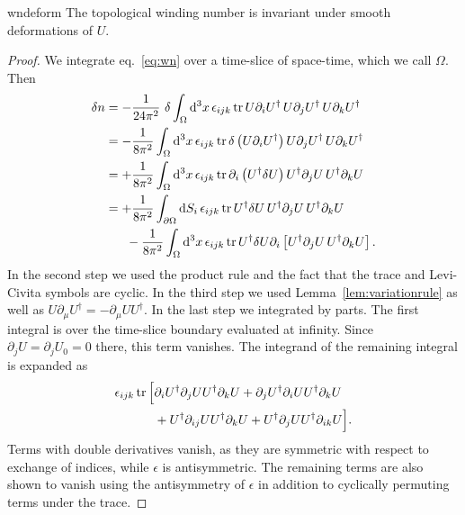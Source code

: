 \begin{theorem}{}{wndeform}
The topological winding number is invariant under smooth
deformations of $U$.
\begin{proof} We integrate eq.~\eqref{eq:wn} over a time-slice of space-time,
which we call $\Omega$. Then
  \begin{align*}
   \var n &=-\frac{1}{24\pi^2}~\var\int_\Omega\dd[3]{x}\epsilon_{ijk}\tr
                U\partial_iU^\dagger\,
                U\partial_jU^\dagger\,
                U\partial_kU^\dagger\\
            &=-\frac{1}{8\pi^2}\int_\Omega \dd[3]{x}\epsilon_{ijk}\tr
                \var\left(U\partial_iU^\dagger\right)
                            U\partial_jU^\dagger\,
                            U\partial_kU^\dagger\\
            &=+\frac{1}{8\pi^2}\int_\Omega \dd[3]{x}\epsilon_{ijk}\tr
                \partial_i\left(U^\dagger\var U\right)
                 U^\dagger\partial_jU\,
                 U^\dagger\partial_kU\\
            &=+\frac{1}{8\pi^2}\int_{\partial\Omega} \dd{S_i}\epsilon_{ijk}\tr
                U^\dagger\var U\,
                U^\dagger\partial_j U\,
                U^\dagger\partial_k U\\
            &~~~~~-\frac{1}{8\pi^2}\int_\Omega \dd[3]{x}\epsilon_{ijk}\tr
                U^\dagger\var U\partial_i\left[
                U^\dagger\partial_j U\,
                U^\dagger\partial_k U\right].
  \end{align*}
  In the second step we used the product rule and the fact that the trace 
  and Levi-Civita symbols are cyclic.
  In the third step we used Lemma~\ref{lem:variationrule} as well as
  $U\partial_\mu U^\dagger=-\partial_\mu UU^\dagger$. In the last step
  we integrated by parts. The first integral is over the time-slice boundary
  evaluated at infinity. Since $\partial_jU=\partial_jU_0=0$ there, this term
  vanishes. The integrand of the remaining integral is expanded as
  \begin{equation*}\begin{aligned}
    \epsilon_{ijk}\tr\Big[&
     \partial_i U^\dagger\partial_j U U^\dagger\partial_k U
     +\partial_j U^\dagger\partial_i U U^\dagger\partial_k U\\
     &+U^\dagger\partial_{ij}UU^\dagger\partial_k U
     +U^\dagger\partial_jUU^\dagger\partial_{ik}U\Big].
  \end{aligned}\end{equation*}
  Terms with double derivatives vanish, as they are symmetric with respect
  to exchange of indices, while $\epsilon$ is antisymmetric. The remaining
  terms are also shown to vanish using the antisymmetry of $\epsilon$
  in addition to cyclically permuting terms under the trace.
\end{proof}
\end{theorem}


